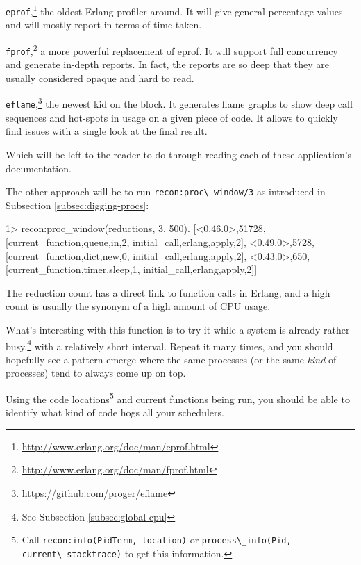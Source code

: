 \documentclass[11pt, oneside]{book}   	%
\newcommand{\otpapp}[1]{\Verb`#1`}
\newcommand{\function}[1]{\Verb`#1`}
\newcommand{\expression}[1]{\Verb`#1`}
\begin{document}
\begin{itemize*}
	\item \otpapp{eprof},\footnote{\href{http://www.erlang.org/doc/man/eprof.html}{http://www.erlang.org/doc/man/eprof.html}} the oldest Erlang profiler around. It will give general percentage values and will mostly report in terms of time taken.
	\item \otpapp{fprof},\footnote{\href{http://www.erlang.org/doc/man/fprof.html}{http://www.erlang.org/doc/man/fprof.html}} a more powerful replacement of eprof. It will support full concurrency and generate in-depth reports. In fact, the reports are so deep that they are usually considered opaque and hard to read. 
	\item \otpapp{eflame},\footnote{\href{https://github.com/proger/eflame}{https://github.com/proger/eflame}} the newest kid on the block. It generates flame graphs to show deep call sequences and hot-spots in usage on a given piece of code. It allows to quickly find issues with a single look at the final result.
\end{itemize*}

Which will be left to the reader to do through reading each of these application's documentation.

The other approach will be to run \function{recon:proc\_window/3} as introduced in Subsection \ref{subsec:digging-procs}:

\begin{VerbatimEshell}
1> recon:proc_window(reductions, 3, 500).
[{<0.46.0>,51728,
  [{current_function,{queue,in,2}},
   {initial_call,{erlang,apply,2}}]},
 {<0.49.0>,5728,
  [{current_function,{dict,new,0}},
   {initial_call,{erlang,apply,2}}]},
 {<0.43.0>,650,
  [{current_function,{timer,sleep,1}},
   {initial_call,{erlang,apply,2}}]}]
\end{VerbatimEshell}

The reduction count has a direct link to function calls in Erlang, and a high count is usually the synonym of a high amount of CPU usage. 

What's interesting with this function is to try it while a system is already rather busy,\footnote{See Subsection \ref{subsec:global-cpu}} with a relatively short interval. Repeat it many times, and you should hopefully see a pattern emerge where the same processes (or the same \emph{kind} of processes) tend to always come up on top.

Using the code locations\footnote{Call \expression{recon:info(PidTerm, location)} or \expression{process\_info(Pid, current\_stacktrace)} to get this information.} and current functions being run, you should be able to identify what kind of code hogs all your schedulers.
\end{document}
